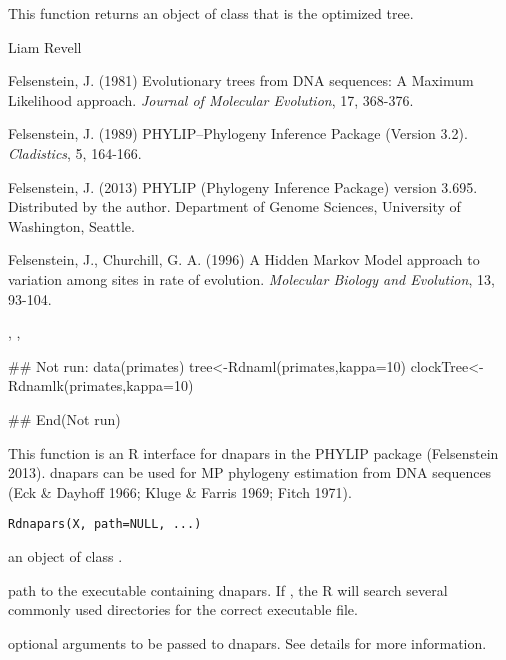 \documentclass[a4paper]{book}
\begin{document}
%
\begin{Value}
This function returns an object of class  that is the optimized tree.
\end{Value}
%
\begin{Author}\relax
Liam Revell 
\end{Author}
%
\begin{References}\relax
Felsenstein, J. (1981) Evolutionary trees from DNA sequences: A Maximum Likelihood approach. \emph{Journal of Molecular Evolution}, 17, 368-376.

Felsenstein, J. (1989) PHYLIP--Phylogeny Inference Package (Version 3.2). \emph{Cladistics}, 5, 164-166.

Felsenstein, J. (2013) PHYLIP (Phylogeny Inference Package) version 3.695. Distributed by the author. Department of Genome Sciences, University of Washington, Seattle.

Felsenstein, J., Churchill, G. A. (1996) A Hidden Markov Model approach to variation among sites in rate of evolution. \emph{Molecular Biology and Evolution}, 13, 93-104.
\end{References}
%
\begin{SeeAlso}\relax
{}, , 
\end{SeeAlso}
%
\begin{Examples}
\begin{ExampleCode}
## Not run: 
data(primates)
tree<-Rdnaml(primates,kappa=10)
clockTree<-Rdnamlk(primates,kappa=10)

## End(Not run)
\end{ExampleCode}
\end{Examples}
%
\begin{Description}\relax
This function is an R interface for dnapars in the PHYLIP package (Felsenstein 2013). dnapars can be used for MP phylogeny estimation from DNA sequences (Eck \& Dayhoff 1966; Kluge \& Farris 1969; Fitch 1971).
\end{Description}
%
\begin{Usage}
\begin{verbatim}
Rdnapars(X, path=NULL, ...)
\end{verbatim}
\end{Usage}
%
\begin{Arguments}
\begin{ldescription}
\item[\code{X}] an object of class .
\item[\code{path}] path to the executable containing dnapars. If , the R will search several commonly used directories for the correct executable file.
\item[\code{...}] optional arguments to be passed to dnapars. See details for more information.
\end{ldescription}
\end{Arguments}
\end{document}
